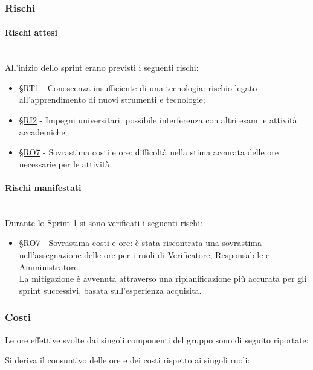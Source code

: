 \documentclass[10pt, letterpaper]{article}
\newcommand{\trisubsection}[1]{\paragraph{#1}\mbox{}\\}
\newcommand{\rif}[1]{\hyperref[#1]{§#1}}
\begin{document}
\subsubsection{Rischi}
\trisubsection{Rischi attesi}
All'inizio dello sprint erano previsti i seguenti rischi:
\begin{itemize}
    \item \rif{RT1} - Conoscenza insufficiente di una tecnologia: rischio legato all'apprendimento di nuovi strumenti e tecnologie;
    \item \rif{RI2} - Impegni universitari: possibile interferenza con altri esami e attività accademiche;
    \item \rif{RO7} - Sovrastima costi e ore: difficoltà nella stima accurata delle ore necessarie per le attività.
\end{itemize}

\trisubsection{Rischi manifestati}
Durante lo Sprint 1 si sono verificati i seguenti rischi:
\begin{itemize}
    \item \rif{RO7} - Sovrastima costi e ore: è stata riscontrata una sovrastima nell'assegnazione delle ore per i ruoli di Verificatore, Responsabile e Amministratore.
          \\La mitigazione è avvenuta attraverso una ripianificazione più accurata per gli sprint successivi, basata sull'esperienza acquisita.
\end{itemize}

\subsubsection{Costi}
Le ore effettive svolte dai singoli componenti del gruppo sono di seguito riportate:

\setRuoloFilippo{\Resp}
\setRuoloChristian{\Amm}
\setRuoloValeria{\Anal}
\setRuoloGiuseppe{\Anal}
\setRuoloFrancesco{\Anal}
\setRuoloLuca{\Anal}
\setRuoloLeonardo{\Verif}



Si deriva il consuntivo delle ore e dei costi rispetto ai singoli ruoli:
\end{document}
